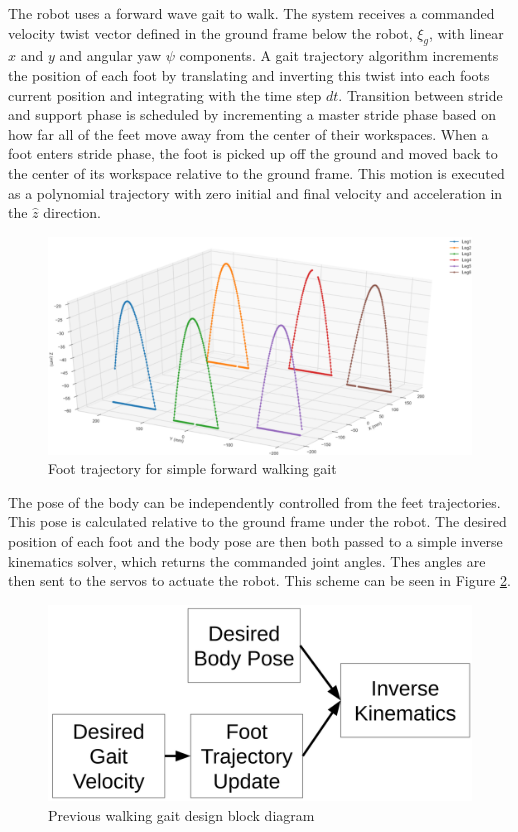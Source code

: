 The robot uses a forward wave gait to walk. The system receives a commanded velocity twist vector defined in the ground frame below the robot, $\xi_g$, with linear $x$ and $y$ and angular yaw $\psi$ components. A gait trajectory algorithm increments the position of each foot by translating and inverting this twist into each foots current position and integrating with the time step $dt$. Transition between stride and support phase is scheduled by incrementing a master stride phase based on how far all of the feet move away from the center of their workspaces. When a foot enters stride phase, the foot is picked up off the ground and moved back to the center of its workspace relative to the ground frame. This motion is executed as a polynomial trajectory with zero initial and final velocity and acceleration in the $\hat{z}$ direction. 

\begin{figure}[H]
    \centerline{\includegraphics[scale=0.09]{./03_related_work/figures/old_trajectory.png}}
    \caption{Foot trajectory for simple forward walking gait}
    \label{fig:old_gait}
\end{figure}

The pose of the body can be independently controlled from the feet trajectories. This pose is calculated relative to the ground frame under the robot. The desired position of each foot and the body pose are then both passed to a simple inverse kinematics solver, which returns the commanded joint angles. Thes angles are then sent to the servos to actuate the robot. This scheme can be seen in Figure \ref{fig:old_gait_block_diagram}.

\begin{figure}[H]
    \centerline{\includegraphics[scale=0.09]{./03_related_work/figures/previous_kinematic_chain.png}}
    \caption{Previous walking gait design block diagram}
    \label{fig:old_gait_block_diagram}
\end{figure}
